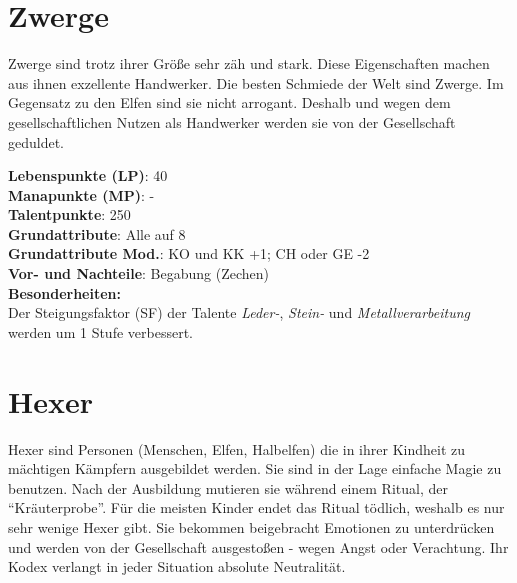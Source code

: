 \section{Zwerge}
Zwerge sind trotz ihrer Größe sehr zäh und stark. Diese Eigenschaften machen aus ihnen exzellente Handwerker. Die besten Schmiede der Welt sind Zwerge. Im Gegensatz zu den Elfen sind sie nicht arrogant. Deshalb und wegen dem gesellschaftlichen Nutzen als Handwerker werden sie von der Gesellschaft geduldet.

\textbf{Lebenspunkte (LP)}: 40 \\
\textbf{Manapunkte (MP)}: - \\
\textbf{Talentpunkte}: 250 \\
\textbf{Grundattribute}: Alle auf 8 \\
\textbf{Grundattribute Mod.}: KO und KK +1; CH oder GE -2 \\
\textbf{Vor- und Nachteile}: Begabung (Zechen) \\

\textbf{Besonderheiten:} \\
Der Steigungsfaktor (SF) der Talente \textit{Leder-}, \textit{Stein-} und \textit{Metallverarbeitung} werden um 1 Stufe verbessert.

\section{Hexer}
Hexer sind Personen (Menschen, Elfen, Halbelfen) die in ihrer Kindheit zu mächtigen Kämpfern ausgebildet werden. Sie sind in der Lage einfache Magie zu benutzen. Nach der Ausbildung mutieren sie während einem Ritual, der "`Kräuterprobe"'. Für die meisten Kinder endet das Ritual tödlich, weshalb es nur sehr wenige Hexer gibt. Sie bekommen beigebracht Emotionen zu unterdrücken und werden von der Gesellschaft ausgestoßen - wegen Angst oder Verachtung. Ihr Kodex verlangt in jeder Situation absolute Neutralität.
